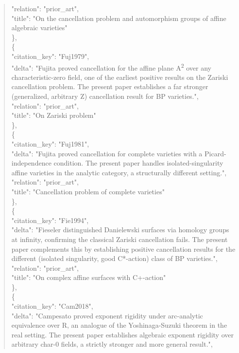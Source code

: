 \documentclass[11pt]{article}
\begin{document}
\begin{quote}
      "relation": "prior\_art",\\
      "title": "On the cancellation problem and automorphism groups of affine algebraic varieties"\\
    \},\\
    \{\\
      "citation\_key": "Fuj1979",\\
      "delta": "Fujita proved cancellation for the affine plane A\textsuperscript{2} over any characteristic-zero field, one of the earliest positive results on the Zariski cancellation problem. The present paper establishes a far stronger (generalized, arbitrary Z) cancellation result for BP varieties.",\\
      "relation": "prior\_art",\\
      "title": "On Zariski problem"\\
    \},\\
    \{\\
      "citation\_key": "Fuj1981",\\
      "delta": "Fujita proved cancellation for complete varieties with a Picard-independence condition. The present paper handles isolated-singularity affine varieties in the analytic category, a structurally different setting.",\\
      "relation": "prior\_art",\\
      "title": "Cancellation problem of complete varieties"\\
    \},\\
    \{\\
      "citation\_key": "Fie1994",\\
      "delta": "Fieseler distinguished Danielewski surfaces via homology groups at infinity, confirming the classical Zariski cancellation fails. The present paper complements this by establishing positive cancellation results for the different (isolated singularity, good C*-action) class of BP varieties.",\\
      "relation": "prior\_art",\\
      "title": "On complex affine surfaces with C+-action"\\
    \},\\
    \{\\
      "citation\_key": "Cam2018",\\
      "delta": "Campesato proved exponent rigidity under arc-analytic equivalence over R, an analogue of the Yoshinaga-Suzuki theorem in the real setting. The present paper establishes algebraic exponent rigidity over arbitrary char-0 fields, a strictly stronger and more general result.",\\

\end{quote}
\end{document}
